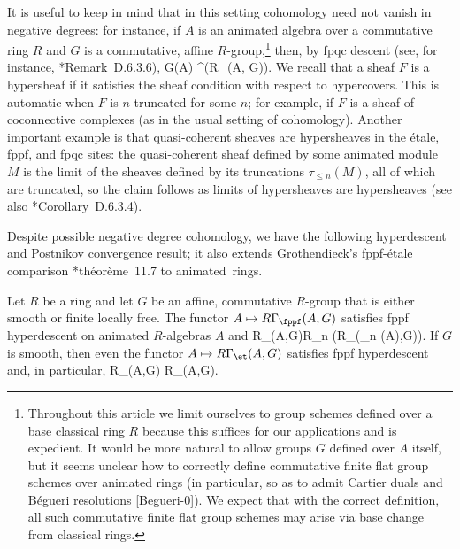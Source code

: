 It is useful to keep in mind that in this setting cohomology need not vanish in negative degrees: for instance, if $A$ is an animated algebra over a commutative ring $R$ and $G$ is a commutative, affine $R$-group,\footnote{Throughout this article we limit ourselves to group schemes defined over a base classical ring $R$ because this suffices for our applications and is expedient. It would be more natural to allow groups $G$ defined over $A$ itself, but it seems unclear how to correctly define commutative finite flat group schemes over animated rings (in particular, so as to admit Cartier duals and B\'{e}gueri resolutions \eqref{Begueri-0}). We expect that with the correct definition, all such commutative finite flat group schemes may arise via base change from classical rings.} then, by fpqc descent (see, for instance, \cite{SAG}*{Remark~D.6.3.6}), %
\be \label{coho-neg-deg}
G(A) \isomto \tau^{}(R\Gamma_\fppf(A, G)).
\ee
We recall that a sheaf $F$ is a hypersheaf if it satisfies the sheaf condition with respect to hypercovers. This is automatic when $F$ is $n$-truncated for some $n$; for example, if $F$ is a sheaf of coconnective complexes (as in the usual setting of cohomology). Another important example is that quasi-coherent sheaves are hypersheaves in the \'etale, fppf, and fpqc sites: the quasi-coherent sheaf defined by some animated module $M$ is the limit of the sheaves defined by its truncations $\tau_{\leq n}(M)$, all of which are truncated, so the claim follows as limits of hypersheaves are hypersheaves (see also \cite{SAG}*{Corollary~D.6.3.4}).
\epp



Despite possible negative degree cohomology, we have the following hyperdescent and Postnikov convergence result; it also extends Grothendieck's fppf-\'{e}tale comparison \cite{Gro68c}*{th\'{e}or\`{e}me~11.7} to animated~rings.

\bthm \label{prop:smooth-fppf-et-comp}
Let $R$ be a ring and let $G$ be an affine, commutative $R$-group that is either smooth or finite locally free. The functor $A\mapsto R\Gamma_\fppf(A,G)$ satisfies fppf hyperdescent on animated $R$-algebras $A$ and
\be \label{eqn:fppf-hyperdescent}
\tst R\Gamma_\fppf(A,G)\isomto R\lim_n (R\Gamma_\fppf(\tau_{\leq n} (A),G)).
\ee
If $G$ is smooth, then even the functor $A\mapsto R\Gamma_\et(A,G)$ satisfies fppf hyperdescent and, in particular,
\be \label{et-fppf-agree}
R\Gamma_\et(A,G) \isomto R\Gamma_\fppf(A,G).
\ee
\ethm

